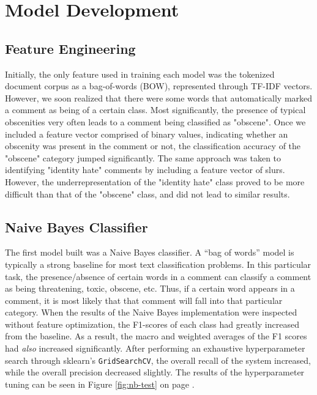 \documentclass{article}
\begin{document}
\section{Model Development}{
  \subsection{Feature Engineering}{
	  Initially, the only feature used in training each model was the tokenized
    document corpus as a bag-of-words (BOW), represented through TF-IDF vectors. 
    However, we soon realized that there were some words that automatically 
    marked a comment as being of a certain class. Most significantly, the 
    presence of typical obscenities very often leads to a comment being 
    classified as "obscene". Once we included a feature vector comprised of 
    binary values, indicating whether an obscenity was present in the comment or
    not, the classification accuracy of the "obscene" category jumped 
    significantly. The same approach was taken to identifying "identity hate" 
    comments by including a feature vector of slurs. However, the 
    underrepresentation of the "identity hate" class proved to be more difficult
    than that of the "obscene" class, and did not lead to similar results.
  }
  \subsection{Naive Bayes Classifier}{
	  The first model built was a Naive Bayes classifier. A “bag of words” model
	  is typically a strong baseline for most text classification problems. In
	  this particular task, the presence/absence of certain words in a comment can
	  classify a comment as being threatening, toxic, obscene, etc. Thus, if a
	  certain word appears in a comment, it is most likely that that comment will
	  fall into that particular category. When the results of the Naive Bayes
	  implementation were inspected without feature optimization, the F1-scores of
	  each class had greatly increased from the baseline. As a result, the macro
	  and weighted averages of the F1 scores had \textit{also} increased
	  significantly. After performing an exhaustive hyperparameter search through
	  sklearn's \texttt{GridSearchCV}, the overall recall of the system increased,
	  while the overall precision decreased slightly. The results of the
	  hyperparameter tuning can be seen in Figure \ref{fig:nb-test} on page
	  \pageref{fig:nb-test}.

}}
\end{document}
